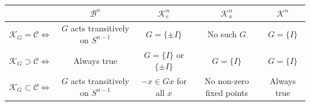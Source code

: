 \documentclass[12pt, reqno]{amsart}
\theoremstyle{definition}
\theoremstyle{remark}
\numberwithin{equation}{section}
\newcommand{\KG}{\mathcal{K}_{G}}
\begin{document}
	\begin{table}[h]
		\centering
		\begin{tabular}{|c|c|c|c|c|}
			\hline
			\diagbox[width=5.5em, height=1.8em]{}{$\mathcal{C}$} & $\mathcal{B}^n$ & $\mathcal{K}_e^n$ & $\mathcal{K}_o^n$ & $\mathcal{K}^n$ \\ 
			\hline
			$\KG = \mathcal{C} \iff$ & 
			\begin{minipage}{0.18\textwidth}
				$G$ acts transitively on $S^{n-1}$
			\end{minipage} & 
			\begin{minipage}{0.18\textwidth}
				$G = \{\pm I\}$
			\end{minipage} & 
			\begin{minipage}{0.18\textwidth}
				No such $G$
			\end{minipage} &
			\begin{minipage}{0.18\textwidth}
			$G=\{I\}$
			\end{minipage} \\
			\hline
			$\KG \supset \mathcal{C} \iff$ & 
			\begin{minipage}{0.18\textwidth}
				Always true
			\end{minipage} & 
			\begin{minipage}{0.18\textwidth}
				$G = \{I\}$ or $\{\pm I\}$
			\end{minipage} & 
			\begin{minipage}{0.18\textwidth}
				$G = \{I\}$
			\end{minipage} &
			\begin{minipage}{0.18\textwidth}
				$G=\{I\}$
			\end{minipage} \\
			\hline
			$\KG \subset \mathcal{C} \iff$ & 
			\begin{minipage}{0.18\textwidth}
				$G$ acts transitively on $S^{n-1}$
			\end{minipage} & 
			\begin{minipage}{0.18\textwidth}
				$-x \in Gx$ for all $x$
			\end{minipage} & 
			\begin{minipage}{0.18\textwidth}
				No non-zero fixed points
			\end{minipage} &
			\begin{minipage}{0.18\textwidth}
				Always true
			\end{minipage} \\
			\hline
		\end{tabular}
	\end{table}
	
\end{document}
